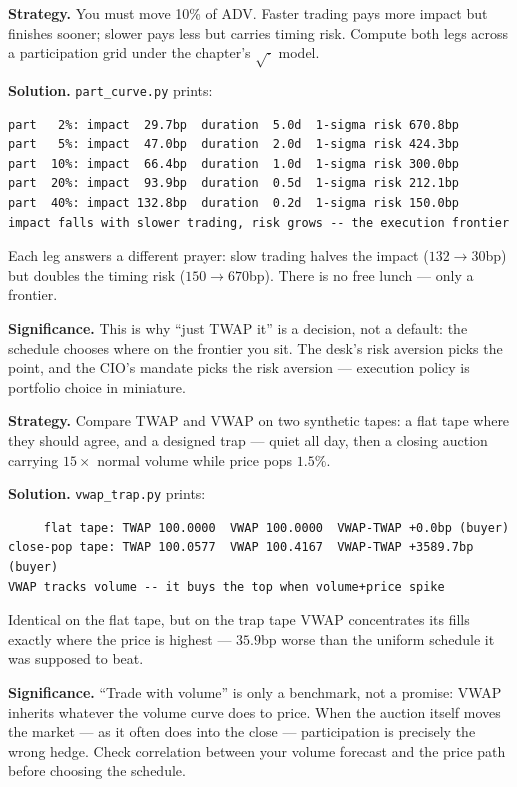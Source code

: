 \begin{example}\label{ex:frontier}
\textbf{Strategy.} You must move 10\% of ADV. Faster trading pays
more impact but finishes sooner; slower pays less but carries
timing risk. Compute both legs across a participation grid under
the chapter's $\sqrt{\cdot}$ model.

\textbf{Solution.} \texttt{part\_curve.py} prints:
\begin{verbatim}
part   2%: impact  29.7bp  duration  5.0d  1-sigma risk 670.8bp
part   5%: impact  47.0bp  duration  2.0d  1-sigma risk 424.3bp
part  10%: impact  66.4bp  duration  1.0d  1-sigma risk 300.0bp
part  20%: impact  93.9bp  duration  0.5d  1-sigma risk 212.1bp
part  40%: impact 132.8bp  duration  0.2d  1-sigma risk 150.0bp
impact falls with slower trading, risk grows -- the execution frontier
\end{verbatim}
Each leg answers a different prayer: slow trading halves the
impact ($132\to30$bp) but doubles the timing risk
($150\to670$bp). There is no free lunch --- only a frontier.

\textbf{Significance.} This is why ``just TWAP it'' is a decision,
not a default: the schedule chooses where on the frontier you sit.
The desk's risk aversion picks the point, and the CIO's mandate
picks the risk aversion --- execution policy is portfolio choice
in miniature.
\end{example}

\begin{example}\label{ex:vwaptrap}
\textbf{Strategy.} Compare TWAP and VWAP on two synthetic
tapes: a flat tape where they should agree, and a designed trap
--- quiet all day, then a closing auction carrying $15\times$
normal volume while price pops $1.5\%$.

\textbf{Solution.} \texttt{vwap\_trap.py} prints:
\begin{verbatim}
     flat tape: TWAP 100.0000  VWAP 100.0000  VWAP-TWAP +0.0bp (buyer)
close-pop tape: TWAP 100.0577  VWAP 100.4167  VWAP-TWAP +3589.7bp (buyer)
VWAP tracks volume -- it buys the top when volume+price spike
\end{verbatim}
Identical on the flat tape, but on the trap tape VWAP concentrates
its fills exactly where the price is highest --- $35.9$bp worse
than the uniform schedule it was supposed to beat.

\textbf{Significance.} ``Trade with volume'' is only a
benchmark, not a promise: VWAP inherits whatever the volume curve
does to price. When the auction itself moves the market --- as it
often does into the close --- participation is precisely the wrong
hedge. Check correlation between your volume forecast and the
price path before choosing the schedule.
\end{example}

